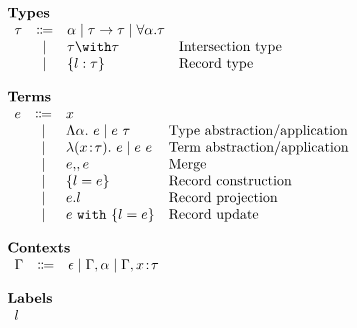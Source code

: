 \[
\begin{array}{l}

    \textbf{Types} \\
    \begin{array}{rcll}
        \ty & \Coloneqq & \alpha \mid \ty \to \ty \mid \forall \alpha. \ty & \\
          & \mid      & \ty \intersects \ty                                  & \text{Intersection type} \\
          & \mid      & \recty l \ty                            & \text{Record type}
    \end{array} \\ \\

    \textbf{Terms} \\
    \begin{array}{rcll}
        e & \Coloneqq & x                               & \\
          & \mid      & \Abs \alpha     e \mid \app e \ty & \text{Type abstraction/application} \\
          & \mid      & \abs {\rel x \ty} e \mid \app e e & \text{Term abstraction/application} \\
          & \mid      & e \dcomma e                     & \text{Merge} \\
          & \mid      & \reccon l e                & \text{Record construction} \\
          & \mid      & e.l                             & \text{Record projection} \\
          & \mid      & \recupd e l e             & \text{Record update}
    \end{array} \\ \\

    \textbf{Contexts} \\
    \begin{array}{rcl}
        \Gamma & \Coloneqq & \epsilon \mid \Gamma, \alpha \mid \Gamma, \rel x \ty
    \end{array} \\ \\

    \textbf{Labels} \\
    \begin{array}{r}
        l
    \end{array}

\end{array}
\]
